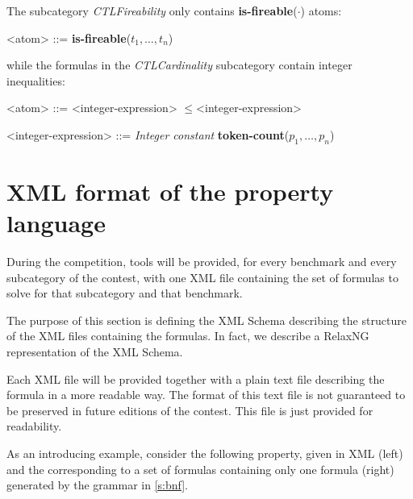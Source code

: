 \documentclass[10pt,english,a4paper]{article}
\newcommand\ctla             {\textbf{A}\xspace}
\newcommand\ctle             {\textbf{E}\xspace}
\newcommand\atomleq          {\boldmath$\leq$\xspace}
\newcommand\atomisfire[1]    {\textbf{is-fireable}(#1)}
\newcommand\atomtokenscnt[1] {\textbf{token-count}(#1)}
\newcommand\mysection[1]{\color{sectioncolor}\section{#1}\color{defaultcolor}}
\begin{document}
The subcategory \emph{CTLFireability} only contains \atomisfire{$\cdot$}
atoms:

\begin{grammar}
<atom> ::= \atomisfire{$t_1, \ldots, t_n$}
\end{grammar}

while the formulas in the \emph{CTLCardinality} subcategory contain
integer inequalities:

\begin{grammar}
<atom> ::= <integer-expression> \atomleq <integer-expression>

<integer-expression> ::= \textit{Integer constant}
\alt \atomtokenscnt{$p_1, \ldots, p_n$}
\end{grammar}



\mysection{XML format of the property language}
\label{s:rng}

During the competition, tools will be provided, for every benchmark and
every subcategory of the contest, with one XML file containing the set of
formulas to solve for that subcategory and that benchmark.

The purpose of this section is defining the XML Schema describing the
structure of the XML files containing the formulas.
In fact, we describe a RelaxNG representation of the XML Schema.

Each XML file will be provided together with a plain text file describing
the formula in a more readable way.
The format of this text file is not guaranteed to be preserved in future
editions of the contest. This file is just provided for readability.

As an introducing example, consider the following property, given in XML
(left) and the corresponding to a set of formulas containing only one
formula (right) generated by the grammar in \cref{s:bnf}.
\end{document}
